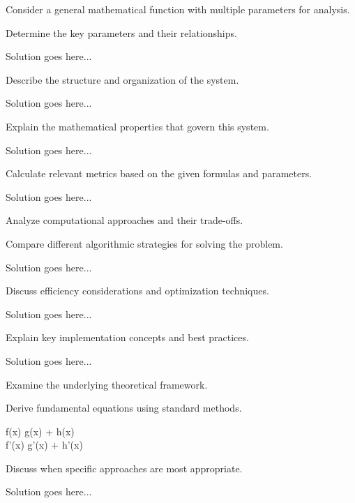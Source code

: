 \documentclass[partnumbering]{../homework}
\begin{document}


Consider a general mathematical function with multiple parameters for analysis.

Determine the key parameters and their relationships.

Solution goes here...

Describe the structure and organization of the system.

Solution goes here...

Explain the mathematical properties that govern this system.

Solution goes here...


Calculate relevant metrics based on the given formulas and parameters.

Solution goes here...


Analyze computational approaches and their trade-offs.

Compare different algorithmic strategies for solving the problem.

Solution goes here...

Discuss efficiency considerations and optimization techniques.

Solution goes here...


Explain key implementation concepts and best practices.

Solution goes here...


Examine the underlying theoretical framework.

Derive fundamental equations using standard methods.

\begin{mmath}
f(x) \eq g(x) + h(x) \\
f'(x) \eq g'(x) + h'(x)
\end{mmath}

Discuss when specific approaches are most appropriate.

Solution goes here...
\end{document}
